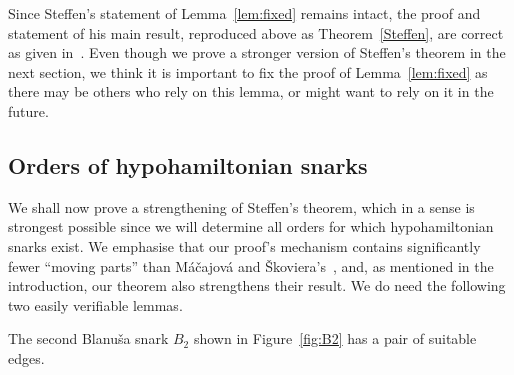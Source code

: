 \documentclass{amcjoucc}
\begin{document}
Since Steffen's statement of Lemma~\ref{lem:fixed} remains intact, the proof and statement of his main result, reproduced above as Theorem~\ref{Steffen}, are correct as given in~\cite{St01}. Even though we prove a stronger version of Steffen's theorem in the next section, we think it is important to fix the proof of Lemma~\ref{lem:fixed} as there may be others who rely on this lemma, or might want to rely on it in the future.





\subsection{Orders of hypohamiltonian snarks}
\label{subsect:orders}

We shall now prove a strengthening of Steffen's theorem, which in a sense is strongest possible since we will determine all orders for which hypohamiltonian snarks exist. We emphasise that our proof's mechanism contains significantly fewer ``moving parts'' than M\'{a}\v{c}ajov\'{a} and \v{S}koviera's~\cite{MS06}, and, as mentioned in the introduction, our theorem also strengthens their result. We do need the following two easily verifiable lemmas.

\begin{lemma}\label{lem:B}
The second Blanu\v{s}a snark $B_2$ shown in Figure~\ref{fig:B2} has a pair of suitable edges.
\end{lemma}
\end{document}
